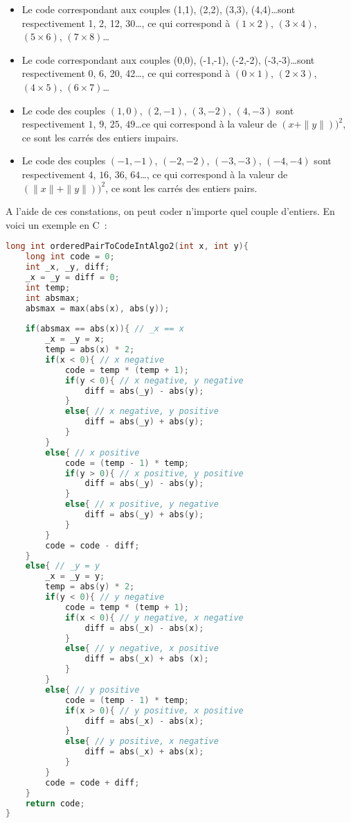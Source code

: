 \documentclass{article}
\begin{document}
\begin{itemize}
\item Le code correspondant aux couples (1,1), (2,2), (3,3), (4,4)\ldots sont respectivement 1, 2, 12, 30\ldots, ce qui correspond à $(1 \times 2)$, $(3 \times 4)$, $(5 \times 6)$, $(7 \times 8)$\ldots
\item Le code correspondant aux couples (0,0), (-1,-1), (-2,-2), (-3,-3)\ldots sont respectivement 0, 6, 20, 42\ldots, ce qui correspond à $(0 \times 1)$, $(2 \times 3)$, $(4 \times 5)$, $(6 \times 7)$\ldots
\item Le code des couples $(1,0)$, $(2,-1)$, $(3,-2)$, $(4,-3)$ sont respectivement $1$, $9$, $25$, $49$\ldots ce qui correspond à la valeur de $(x + \|y\|))^{2}$, ce sont les carrés des entiers impairs.
\item Le code des couples $(-1,-1)$, $(-2,-2)$, $(-3,-3)$, $(-4,-4)$ sont respectivement $4$, $16$, $36$, $64$\ldots,  ce qui correspond à la valeur de $(\|x\| + \|y\|))^{2}$, ce sont les carrés des entiers pairs.
\end{itemize}


A l'aide de ces constations, on peut coder n'importe quel couple d'entiers. En voici un exemple en C~:


\begin{lstlisting}[language=C]
long int orderedPairToCodeIntAlgo2(int x, int y){
	long int code = 0;
	int _x, _y, diff;
	_x = _y = diff = 0;
	int temp;
	int absmax;	
	absmax = max(abs(x), abs(y));	
	
	if(absmax == abs(x)){ // _x == x 
		_x = _y = x;
		temp = abs(x) * 2;
		if(x < 0){ // x negative
			code = temp * (temp + 1);
			if(y < 0){ // x negative, y negative
				diff = abs(_y) - abs(y);
			}
			else{ // x negative, y positive
				diff = abs(_y) + abs(y);
			}
		}
		else{ // x positive
			code = (temp - 1) * temp; 
			if(y > 0){ // x positive, y positive
				diff = abs(_y) - abs(y);
			}
			else{ // x positive, y negative
				diff = abs(_y) + abs(y);
			}
		}
		code = code - diff;
	}
	else{ // _y = y
		_x = _y = y;
		temp = abs(y) * 2;
		if(y < 0){ // y negative
			code = temp * (temp + 1);		
			if(x < 0){ // y negative, x negative
				diff = abs(_x) - abs(x);
			}
			else{ // y negative, x positive
				diff = abs(_x) + abs (x);
			}
		}
		else{ // y positive
			code = (temp - 1) * temp;
			if(x > 0){ // y positive, x positive
				diff = abs(_x) - abs(x);
			}
			else{ // y positive, x negative
				diff = abs(_x) + abs(x);
			}	
		}	
		code = code + diff;	
	}
	return code;
}
\end{lstlisting}
\end{document}
